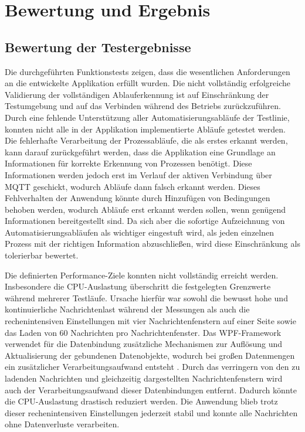 \chapter{Bewertung und Ergebnis}
\label{cha:Bewertung und Ergebnis}

\section{Bewertung der Testergebnisse}
Die durchgeführten Funktionstests zeigen, dass die wesentlichen Anforderungen an die entwickelte Applikation erfüllt wurden. Die nicht vollständig erfolgreiche Validierung der vollständigen Ablauferkennung ist auf Einschränkung der Testumgebung und auf das Verbinden während des Betriebs zurückzuführen. Durch eine fehlende Unterstützung aller Automatisierungsabläufe der Testlinie, konnten nicht alle in der Applikation implementierte Abläufe getestet werden. Die fehlerhafte Verarbeitung der Prozessabläufe, die als erstes erkannt werden, kann darauf zurückgeführt werden, dass die Applikation eine Grundlage an Informationen für korrekte Erkennung von Prozessen benötigt. Diese Informationen werden jedoch erst im Verlauf der aktiven Verbindung über MQTT geschickt, wodurch Abläufe dann falsch erkannt werden. Dieses Fehlverhalten der Anwendung könnte durch Hinzufügen von Bedingungen behoben werden, wodurch Abläufe erst erkannt werden sollen, wenn genügend Informationen bereitgestellt sind. Da sich aber die sofortige Aufzeichnung von Automatisierungsabläufen als wichtiger eingestuft wird, als jeden einzelnen Prozess mit der richtigen Information abzuschließen, wird diese Einschränkung als tolerierbar bewertet.

Die definierten Performance-Ziele konnten nicht vollständig erreicht werden. Insbesondere die CPU-Auslastung überschritt die festgelegten Grenzwerte während mehrerer Testläufe. Ursache hierfür war sowohl die bewusst hohe und kontinuierliche Nachrichtenlast während der Messungen als auch die rechenintensiven Einstellungen mit vier Nachrichtenfenstern auf einer Seite sowie das Laden von 60 Nachrichten pro Nachrichtenfenster. Das WPF-Framework verwendet für die Datenbindung zusätzliche Mechanismen zur Auflösung und Aktualisierung der gebundenen Datenobjekte, wodurch bei großen Datenmengen ein zusätzlicher Verarbeitungsaufwand entsteht \autocite{adegeoOptimizingPerformanceData}. Durch das verringern von den zu ladenden Nachrichten und gleichzeitig dargestellten Nachrichtenfenstern wird auch der Verarbeitungsaufwand dieser Datenbindungen entfernt. Dadurch könnte die CPU-Auslastung drastisch reduziert werden. Die Anwendung blieb trotz dieser rechenintensiven Einstellungen jederzeit stabil und konnte alle Nachrichten ohne Datenverluste verarbeiten. 

